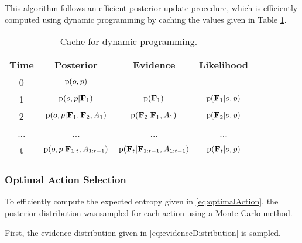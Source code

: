             

            This algorithm follows an efficient posterior update procedure, which is efficiently computed using dynamic programming by caching the values given in Table \ref{tab:dynamicProgramming}.
            \begin{table}[h]
                \centering
                \begin{tabular}{c|c|c|c} %
                    \hline %
                    Time & Posterior & Evidence & Likelihood\\
                    [0.5ex] %
                    \hline\hline %
                    0 & $\text{p}(o,p)$ & & \\[0.5ex] 
                    1 & $\text{p}(o,p|\mathbf{F}_1)$ & $\text{p}(\mathbf{F}_1)$ & $\text{p}(\mathbf{F}_1|o,p)$ \\[0.5ex] 
                    2 & $\text{p}(o,p|\mathbf{F}_1,\mathbf{F}_2,A_1)$ & $\text{p}(\mathbf{F}_2|\mathbf{F}_1,A_1)$ & $\text{p}(\mathbf{F}_2|o,p)$ \\
                    ...&...&...&...\\[0.5ex] 
                    t & $\text{p}(o,p|\mathbf{F}_{1:t},A_{1:t-1})$ & $\text{p}(\mathbf{F}_t|\mathbf{F}_{1:t-1},A_{1:t-1})$ & $\text{p}(\mathbf{F}_t|o,p)$
                \end{tabular}
                \caption{Cache for dynamic programming.}
                \label{tab:dynamicProgramming}
            \end{table}

            \subsubsection{Optimal Action Selection}

                To efficiently compute the expected entropy given in \eqref{eq:optimalAction}, the posterior distribution was sampled for each action using a Monte Carlo method. 

                First, the evidence distribution given in \eqref{eq:evidenceDistribution} is sampled.

